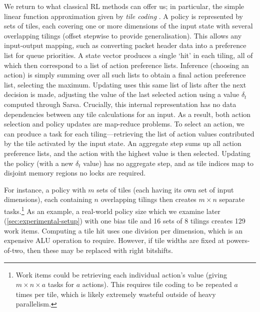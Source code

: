 \documentclass[
sigconf,natbib=false
,anonymous=true
,10pt
]{acmart}
\begin{document}

We return to what classical RL methods can offer us; in particular, the simple linear function approximation given by \emph{tile coding} \cite[pp.\ \numrange{217}{221}]{RL2E}.
A policy is represented by sets of tiles, each covering one or more dimensions of the input state with several overlapping tilings (offset stepwise to provide generalisation).
This allows any input-output mapping, such as converting packet header data into a preference list for queue priorities.
A state vector produces a single `hit' in each tiling, all of which then correspond to a list of action preference lists.
Inference (choosing an action) is simply summing over all such lists to obtain a final action preference list, selecting the maximum.
Updating uses this same list of lists after the next decision is made, adjusting the value of the last selected action using a value $\delta_t$ computed through Sarsa.
Crucially, this internal representation has no data dependencies between any tile calculations for an input.
As a result, both action selection and policy updates are map-reduce problems.
To select an action, we can produce a task for each tiling---retrieving the list of action values contributed by the tile activated by the input state.
An aggregate step sums up all action preference lists, and the action with the highest value is then selected.
Updating the policy (with a new $\delta_t$ value) has no aggregate step, and as tile indices map to disjoint memory regions no locks are required.

For instance, a policy with $m$ sets of tiles (each having its own set of input dimensions), each containing $n$ overlapping tilings then creates $m \times n$ separate tasks.\footnote{Work items could be retrieving each individual action's value (giving $m \times n \times a$ tasks for $a$ actions). This requires tile coding to be repeated $a$ times per tile, which is likely extremely wasteful outside of heavy parallelism.}
As an example, a real-world policy size which we examine later (\cref{sec:experimental-setup}) with one bias tile and \num{16} sets of \num{8} tilings creates \num{129} work items.
Computing a tile hit uses one division per dimension, which is an expensive ALU operation to require.
However, if tile widths are fixed at powers-of-two, then these may be replaced with right bitshifts.
\end{document}
